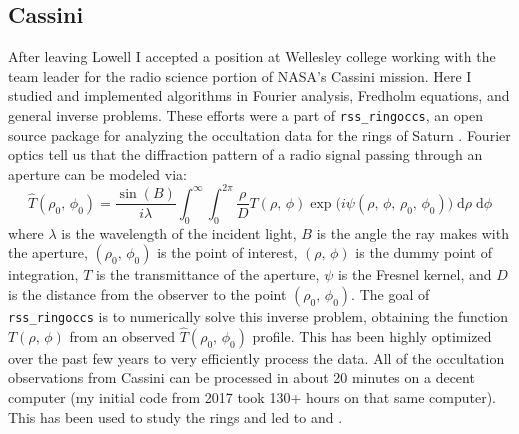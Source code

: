 \documentclass{article}
\theoremstyle{plain}
\begin{document}
        \subsection{Cassini}
            After leaving Lowell I accepted a position at Wellesley college
            working with the team leader for the radio science portion of NASA's
            Cassini mission. Here I studied and implemented algorithms in
            Fourier analysis, Fredholm equations, and general inverse problems.
            These efforts were a part of \texttt{rss\_ringoccs}, an open source
            package for analyzing the occultation data for the rings of Saturn
            \cite{rssringoccs}. Fourier optics tell us that the diffraction
            pattern of a radio signal passing through an aperture can be
            modeled via:
            \begin{equation}
                \hat{T}(\rho_{0},\,\phi_{0})=
                    \frac{\sin(B)}{i\lambda}
                    \int_{0}^{\infty}
                    \int_{0}^{2\pi}
                        \frac{\rho}{D}
                        T(\rho,\,\phi)
                        \exp\big(i\psi(\rho,\,\phi,\,\rho_{0},\,\phi_{0})\big)\;
                    \textrm{d}\rho\;
                    \textrm{d}\phi
            \end{equation}
            where $\lambda$ is the wavelength of the incident light, $B$ is
            the angle the ray makes with the aperture, $(\rho_{0},\,\phi_{0})$
            is the point of interest, $(\rho,\,\phi)$ is the dummy point of
            integration, $T$ is the transmittance of the aperture, $\psi$ is
            the Fresnel kernel, and $D$ is the distance from the observer to
            the point $(\rho_{0},\,\phi_{0})$. The goal of
            \texttt{rss\_ringoccs} is to numerically solve this inverse problem,
            obtaining the function $T(\rho,\,\phi)$ from an observed
            $\hat{T}(\rho_{0},\,\phi_{0})$ profile. This has been
            highly optimized over the past few years to very efficiently
            process the data. All of the occultation observations from Cassini
            can be processed in about 20 minutes on a decent computer
            (my initial code from 2017 took 130+ hours on that same computer).
            This has been used to study the rings and led to
            \cite{FRENCH2023115678} and \cite{NICHOLSON2023115287}.
\end{document}
